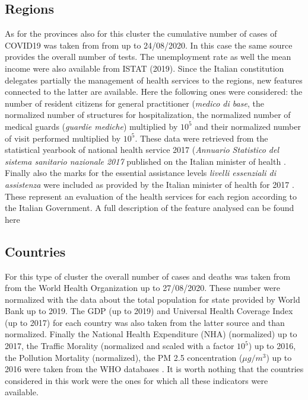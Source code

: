 \documentclass[
12pt, %
a4paper, %
oneside, %
headinclude,footinclude, %
BCOR5mm, %
]{scrartcl}
\begin{document}
\subsection{Regions}
As for the provinces also for this cluster the cumulative number of cases of COVID19 was taken from from \cite{github-protezionecivile} up to 24/08/2020. In this case the same source provides the overall number of tests. The unemployment rate as well the mean income were also available from ISTAT \cite{ISTAT} (2019). Since the Italian constitution delegates partially the management of health services to the regions, new features connected to the latter are available. Here the following ones were considered: the number of resident citizens for general practitioner (\textit{medico di base}, the normalized number of structures for hospitalization, the normalized number of medical guards (\textit{guardie mediche}) multiplied by $10^{5}$ and their normalized number of visit performed multiplied by $10^{5}$. These data were retrieved from the statistical yearbook of national health service 2017 (\textit{Annuario Statistico del sistema sanitario nazionale 2017} published on the Italian minister of health \cite{AnnuarioSSN2017}. Finally also  the marks for the essential assistance levels \textit{livelli essenziali di assistenza} were included as provided by the Italian minister of health for 2017 \cite{LeaRank} . These represent an evaluation of the health services for each region according to the Italian Government. A full description of the feature analysed can be found here \cite{LeaDesc}

\subsection{Countries}

For this type of cluster the overall number of cases and deaths was taken from from the World Health Organization \cite{whoCases} up to 27/08/2020. These number were normalized with the data about the total population for state provided by World Bank \cite{worldBank} up to 2019. The GDP (up to 2019) and Universal Health Coverage Index \cite{whoUHC} (up to 2017) for each country was also taken from the latter source \cite{worldBank} and than normalized. Finally the National Health Expenditure (NHA) (normalized) up to 2017, the Traffic Morality (normalized and scaled with a factor $10^{5}$) up to 2016, the Pollution Mortality (normalized), the PM 2.5 concentration ($\mu g/m^{3}$) up to 2016 were taken from the WHO databases \cite{whoDb}. It is worth nothing that the countries considered in this work were the ones for which all these indicators were available. 
\end{document}
